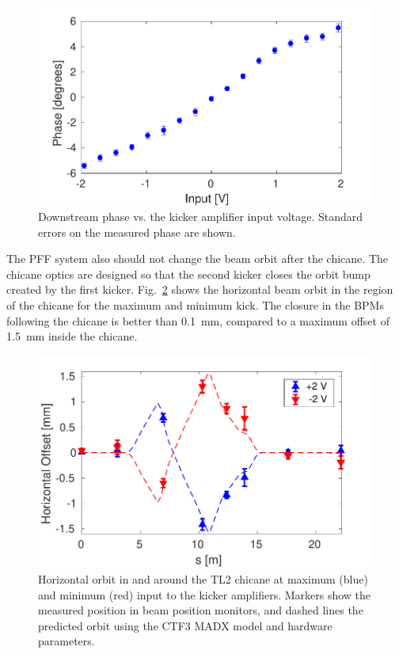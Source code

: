 \documentclass[%
 reprint,
superscriptaddress,
 amsmath,amssymb,
 prl,
]{revtex4-1}
\begin{document}

\begin{figure}
	\includegraphics[width=\columnwidth]{figs/corrRange}
	\caption{\label{fig:corrRange}Downstream phase vs. the kicker amplifier 
	input voltage. Standard errors on the measured phase are shown.}
\end{figure}

The PFF system also should not change the beam orbit after the chicane. The 
chicane optics are designed so that the second kicker closes the orbit bump 
created by the first kicker.
Fig.~\ref{fig:orbClos} shows the horizontal beam orbit in the region 
of the chicane for the maximum and minimum kick. The closure in 
the BPMs following the chicane is better than 0.1~mm, compared to a maximum 
offset of 1.5~mm inside the chicane.

\begin{figure}
	\includegraphics[width=\columnwidth]{figs/orbClos}
	\caption{\label{fig:orbClos}Horizontal orbit in and around the TL2 chicane 
	at maximum (blue) and 
	minimum (red) 
	input to the kicker amplifiers. Markers show the measured position in beam 
	position monitors, and dashed lines the predicted orbit using the 
	CTF3 MADX model and hardware parameters.}
\end{figure}
\end{document}
